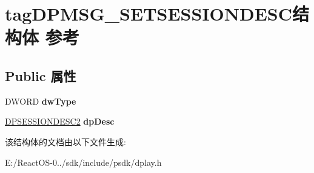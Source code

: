 \hypertarget{structtag_d_p_m_s_g___s_e_t_s_e_s_s_i_o_n_d_e_s_c}{}\section{tag\+D\+P\+M\+S\+G\+\_\+\+S\+E\+T\+S\+E\+S\+S\+I\+O\+N\+D\+E\+S\+C结构体 参考}
\label{structtag_d_p_m_s_g___s_e_t_s_e_s_s_i_o_n_d_e_s_c}
\subsection*{Public 属性}
\begin{DoxyCompactItemize}
\item 
\mbox{\label{structtag_d_p_m_s_g___s_e_t_s_e_s_s_i_o_n_d_e_s_c_a94c12546b9ab22008201c0ffd93e46af}} 
D\+W\+O\+RD {\bfseries dw\+Type}
\item 
\mbox{\label{structtag_d_p_m_s_g___s_e_t_s_e_s_s_i_o_n_d_e_s_c_af2f5cf3fb7c8561a1423e491e2efb003}} 
\hyperlink{structtag_d_p_s_e_s_s_i_o_n_d_e_s_c2}{D\+P\+S\+E\+S\+S\+I\+O\+N\+D\+E\+S\+C2} {\bfseries dp\+Desc}
\end{DoxyCompactItemize}


该结构体的文档由以下文件生成\+:\begin{DoxyCompactItemize}
\item 
E\+:/\+React\+O\+S-\/0../sdk/include/psdk/dplay.\+h\end{DoxyCompactItemize}
